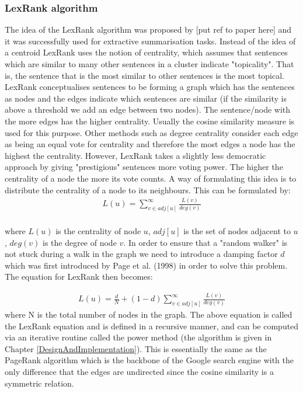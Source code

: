 \subsubsection{LexRank algorithm}
The idea of the LexRank algorithm was proposed by [put ref to paper here] and it was successfully used for extractive summarisation tasks. Instead of the idea of a centroid LexRank uses the notion of centrality, which
assumes that sentences which are similar to many other sentences in a cluster indicate "topicality". That is, the
sentence that is the most similar to other sentences is the most topical. LexRank conceptualises sentences to be forming a graph which has the sentences as nodes and the edges indicate which sentences are similar (if the similarity is above a threshold we add an edge between two nodes). The sentence/node with the more edges has the higher centrality. Usually the cosine similarity measure is used for this purpose. Other methods such as degree centrality consider each edge as being an equal vote for centrality and therefore the most edges a node has the highest the centrality. However, LexRank takes a slightly less democratic approach by giving "prestigious" sentences more voting power. The higher the centrality of a node the more its vote counts. A way of formulating this idea is to distribute the centrality of a node to its neighbours. This can be formulated by:
\begin{eqnarray}
L(u) = \sum_{v \in adj[u]}^{\infty}\frac{L(v)}{deg(v)}
\end{eqnarray} \\
where $L(u)$ is the centrality of node $u$, $adj[u]$ is the set of nodes adjacent to $u$, $deg(v)$ is the degree of node $v$.
In order to ensure that a "random walker" is not stuck during a walk in the graph we need to introduce a damping factor $d$ which was first introduced by Page et al. (1998) in order to solve this problem. The equation for LexRank then becomes:

\begin{eqnarray}\label{LexRankEquation}
L(u) = \frac{d}{N} + (1-d) \sum_{v \in adj[u]}^{\infty}\frac{L(v)}{deg(v)}
\end{eqnarray} 
where N is the total number of nodes in the graph. The above equation is called the LexRank equation and is defined in a recursive manner, and can be computed via an iterative routine called the power method (the algorithm is given in Chapter \ref{DesignAndImplementation}). This is essentially the same as the PageRank algorithm which is the backbone of the Google search engine with the only difference that the edges are undirected since the cosine similarity is a symmetric relation.

